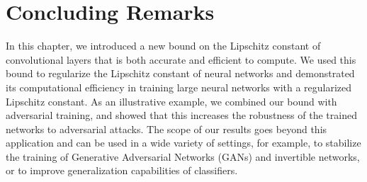 \section{Concluding Remarks}
\label{section:ch5-concluding_remarks}

In this chapter, we introduced a new bound on the Lipschitz constant of convolutional layers that is both accurate and efficient to compute.
We used this bound to regularize the Lipschitz constant of neural networks and demonstrated its computational efficiency in training large neural networks with a regularized Lipschitz constant.
As an illustrative example, we combined our bound with adversarial training, and showed that this increases the robustness of the trained networks to  adversarial attacks.
The scope of our results goes beyond this application and can be used in a wide variety of settings, for example, to stabilize the training of Generative Adversarial Networks (GANs) and invertible networks, or to improve generalization capabilities of classifiers.

